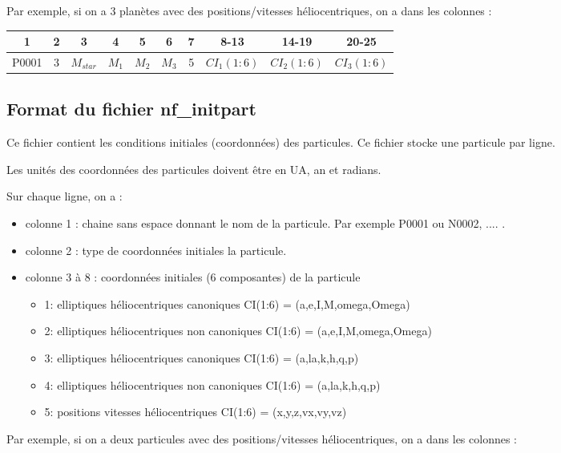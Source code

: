 \documentclass[11pt]{article}
\begin{document}
 Par exemple, si on a 3 plan\`etes avec des positions/vitesses h\'eliocentriques, on a dans les colonnes :
 
\begin{tabular}{|c|c|c|c|c|c|c|c|c|c|} \hline
1 &  2 &  3 & 4 & 5 &6 &7 &8-13 &14-19 &20-25 \\ \hline
P0001 & 3 & $M_{star}$  & $M_1$ &  $M_2$ & $M_3$  &5 &$CI_1(1:6)$ & $CI_2(1:6)$&$CI_3(1:6)$\\    \hline
\end{tabular}

\subsection{Format du fichier nf\_initpart}

Ce fichier contient les conditions initiales (coordonn\'ees) des particules. 
Ce fichier stocke une particule par ligne.

Les unit\'es des coordonn\'ees des particules doivent \^etre en UA, an et radians.

Sur chaque ligne, on a :
\begin{itemize}
\item colonne 1 : chaine sans espace donnant le nom de la particule. Par exemple P0001 ou N0002, .... .
\item colonne 2 :  type de coordonn\'ees initiales la particule.
\item colonne 3 \`a 8 :  coordonn\'ees initiales (6 composantes)  de la particule
\begin{itemize}
\item 1:  elliptiques h\'eliocentriques canoniques
	     CI(1:6) = (a,e,I,M,omega,Omega)
\item 2:  elliptiques h\'eliocentriques non canoniques
	     CI(1:6) = (a,e,I,M,omega,Omega)
\item 3:  elliptiques h\'eliocentriques canoniques
	     CI(1:6) = (a,la,k,h,q,p)
\item 4:  elliptiques h\'eliocentriques non canoniques
	     CI(1:6) = (a,la,k,h,q,p)
\item 5:  positions vitesses h\'eliocentriques
	     CI(1:6) = (x,y,z,vx,vy,vz)
\end{itemize}

\end{itemize}

Par exemple, si on a deux particules avec des positions/vitesses h\'eliocentriques, on a dans les colonnes :
 
\end{document}
